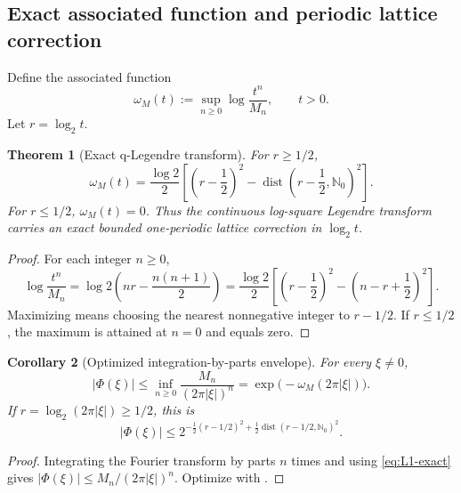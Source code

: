 \documentclass[11pt,oneside]{article}
\numberwithin{equation}{section}
\theoremstyle{plain}
\newtheorem{theorem}{Theorem}[section]
\newtheorem{corollary}[theorem]{Corollary}
\theoremstyle{definition}
\theoremstyle{remark}
\newcommand{\N}{\mathbb N}
\newcommand{\dist}{\operatorname{dist}}
\begin{document}
\subsection{Exact associated function and periodic lattice correction}

Define the associated function
\begin{equation}
 \omega_M(t):=\sup_{n\geq0}\log\frac{t^n}{M_n},
 \qquad t>0.
 \label{eq:associated-function}
\end{equation}
Let $r=\log_2t$.

\begin{theorem}[Exact q-Legendre transform]
\label{thm:q-Legendre}
For $r\geq1/2$,
\begin{equation}
 \boxed{
 \omega_M(t)=\frac{\log2}{2}
 \left[
 \left(r-\frac12\right)^2
 -\dist\!\left(r-\frac12,\N_0\right)^2
 \right].}
 \label{eq:q-Legendre}
\end{equation}
For $r\leq1/2$, $\omega_M(t)=0$.  Thus the continuous log-square Legendre transform carries
an exact bounded one-periodic lattice correction in $\log_2t$.
\end{theorem}

\begin{proof}
For each integer $n\geq0$,
\[
 \log\frac{t^n}{M_n}
 =\log2\left(nr-\frac{n(n+1)}2\right)
 =\frac{\log2}{2}\left[
 \left(r-\frac12\right)^2-
 \left(n-r+\frac12\right)^2\right].
\]
Maximizing means choosing the nearest nonnegative integer to $r-1/2$.  If $r\leq1/2$, the
maximum is attained at $n=0$ and equals zero.
\end{proof}

\begin{corollary}[Optimized integration-by-parts envelope]
\label{cor:IBP-envelope}
For every $\xi\neq0$,
\begin{equation}
 \boxed{
 |\Phi(\xi)|
 \leq\inf_{n\geq0}\frac{M_n}{(2\pi|\xi|)^n}
 =\exp\bigl(-\omega_M(2\pi|\xi|)\bigr).}
 \label{eq:IBP-envelope}
\end{equation}
If $r=\log_2(2\pi|\xi|)\geq1/2$, this is
\begin{equation}
 |\Phi(\xi)|\leq
 2^{-\frac12(r-1/2)^2+\frac12\dist(r-1/2,\N_0)^2}.
 \label{eq:explicit-IBP-envelope}
\end{equation}
\end{corollary}

\begin{proof}
Integrating the Fourier transform by parts $n$ times and using
\eqref{eq:L1-exact} gives
$|\Phi(\xi)|\leq M_n/(2\pi|\xi|)^n$.  Optimize with
.
\end{proof}
\end{document}
